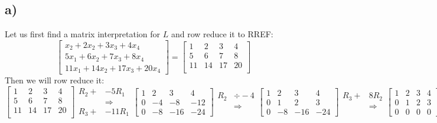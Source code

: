 \documentclass{article}
\begin{document}
\subsection*{a)}
Let us first find a matrix interpretation for $L$ and row reduce it to RREF: $$\begin{bmatrix}
    x_2+2x_2+3x_3+4x_4\\
    5x_1+6x_2+7x_3+8x_4\\
    11x_1+14x_2+17x_3+20x_4
\end{bmatrix}=\begin{bmatrix}
    1& 2 & 3 & 4 \\
    5& 6 & 7 & 8 \\
    11& 14 & 17 & 20 \\
\end{bmatrix}$$
Then we will row reduce it:
$$\begin{bmatrix}
    1& 2 & 3 & 4 \\
    5& 6 & 7 & 8 \\
    11& 14 & 17 & 20 \\
\end{bmatrix}\begin{aligned}
    R_2 +& -5R_1\\
    &\Rightarrow\\
    R_3 +& -11R_1
\end{aligned}\begin{bmatrix}
    1&2&3&4\\
    0&-4&-8&-12\\
    0&-8&-16&-24
\end{bmatrix}\begin{aligned}
    R_2 &\div -4\\
    &\Rightarrow\\
\end{aligned}\begin{bmatrix}
    1&2&3&4\\
    0&1&2&3\\
    0&-8&-16&-24
\end{bmatrix}\begin{aligned}
    R_3 +& 8R_2\\
    &\Rightarrow\\
\end{aligned}\begin{bmatrix}
    1&2&3&4\\
    0&1&2&3\\
    0&0&0&0
\end{bmatrix}$$
\end{document}

